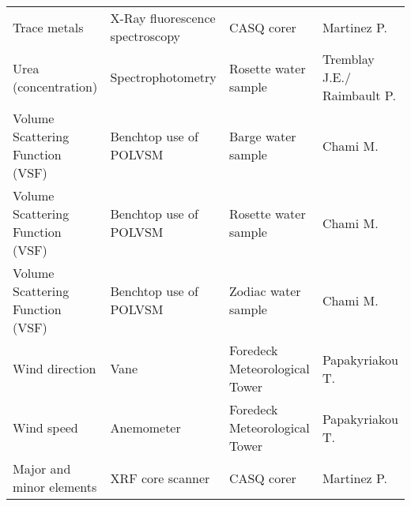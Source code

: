 \begin{landscape}
\begin{longtable}[t]{llll}
Trace metals & X-Ray fluorescence spectroscopy & CASQ corer & Martinez P.\\
Urea (concentration) & Spectrophotometry & Rosette water sample & Tremblay J.E./ Raimbault P.\\
\addlinespace
Volume Scattering Function (VSF) & Benchtop use of POLVSM & Barge water sample & Chami M.\\
Volume Scattering Function (VSF) & Benchtop use of POLVSM & Rosette water sample & Chami M.\\
Volume Scattering Function (VSF) & Benchtop use of POLVSM & Zodiac water sample & Chami M.\\
Wind direction & Vane & Foredeck Meteorological Tower & Papakyriakou T.\\
Wind speed & Anemometer & Foredeck Meteorological Tower & Papakyriakou T.\\
\addlinespace
Major and minor elements & XRF core scanner & CASQ corer & Martinez P.\\*
\end{longtable}
\endgroup{}
\end{landscape}
